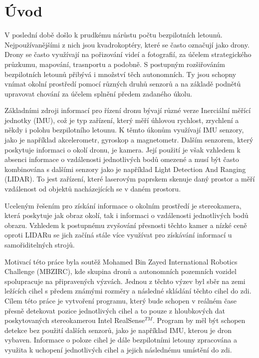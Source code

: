 \documentclass[twoside]{ctuthesis}
\begin{document}
\maketitle

\chapter{Úvod}
V poslední době došlo k prudkému nárůstu počtu bezpilotních letounů. Nejpoužívanějšími z nich jsou kvadrokoptéry, které se často označují jako drony.\cite{bussinesinsider} Drony se často využívají na pořizování videí a fotografií, za účelem strategického průzkumu, mapování, trasnportu a podobně. S postupným rozšiřováním bezpilotních letounů přibývá i množství těch autonomních. Ty jsou schopny vnímat okolní prostředí pomocí různých druhů senzorů a na základě podnětů upravovat chování za účelem splnění předem zadaného úkolu.

Základními zdroji informací pro řízení dronu bývají různé verze Inerciální měřící jednotky (IMU), což je typ zařízení, který měří úhlovou rychlost, zrychlení a někdy i polohu bezpilotního letounu. K těmto úkonům využívají IMU senzory, jako je například akcelerometr, gyroskop a magnetometr. Dalším senzorem, který poskytuje informaci o okolí dronu, je kamera. Její použití je však vzhledem k absenci informace o vzdálenosti jednotlivých bodů omezené a musí být často kombinována s dalšími senzory jako je například Light Detection And Ranging (LIDAR). To jest zařízení, které laserovým paprskem skenuje daný prostor a měří vzdálenost od objektů nacházejících se v daném prostoru.

Uceleným řešením pro získání informace o okolním prostředí je stereokamera, která poskytuje jak obraz okolí, tak i informaci o vzdálenosti jednotlivých bodů obrazu. Vzhledem k postupnému zvyšování přesnosti těchto kamer a nízké ceně oproti LIDARu se jich začíná stále více využívat pro získávání informací u samořiditelných strojů.

Motivací této práce byla soutěž Mohamed Bin Zayed International Robotics Challenge (MBZIRC), kde skupina dronů a autonomních pozemních vozidel spolupracuje na připravených výzvách. Jednou z těchto výzev byl sběr na zemi ležících cihel s předem známými rozměry a následné skládání těchto cihel do zdi. Cílem této práce je vytvoření programu, který bude schopen v reálném čase přesně detekovat pozice jednotlivých cihel a to pouze z hloubkových dat poskytovaných stereokamerou Intel\textregistered{} RealSense$^{TM}$. Program by měl být schopen detekce bez použití dalších senzorů, jako je například IMU, kterou je dron vybaven. Informace o poloze cihel je dále bezpilotními letouny zpracována a využita k uchopení jednotlivých cihel a jejich následnému umístění do zdi.
\end{document}
